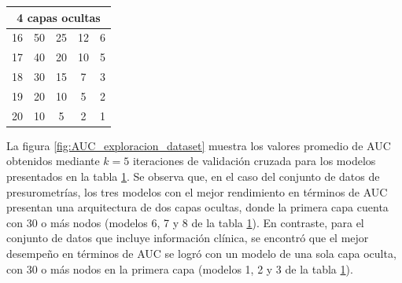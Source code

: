 \begin{table}[H]
\begin{tabular}{l c c c c}
    \hline
    \multicolumn{5}{c}{4 capas ocultas} \\
    \hline

    16               & 50             & 25			        & 12              & 6	\\
    17               & 40             & 20			        & 10              & 5	\\
    18               & 30             & 15			        & 7               & 3	\\
    19               & 20             & 10			        & 5               & 2	\\
    20               & 10             & 5			          & 2               & 1	\\

		\bottomrule
		\hline
	\end{tabular}
	\label{tab:tablamodelos}
\end{table}

La figura \ref{fig:AUC_exploracion_dataset} muestra los valores promedio de AUC obtenidos 
mediante $k=5$ iteraciones de validación cruzada para los modelos presentados en la tabla \ref{tab:tablamodelos}. 
Se observa que, en el caso del conjunto de datos de presurometrías, los tres modelos con el mejor rendimiento 
en términos de AUC presentan una arquitectura de dos capas ocultas, donde la primera capa cuenta con 30 o más 
nodos (modelos 6, 7 y 8 de la tabla \ref{tab:tablamodelos}). En contraste, para el conjunto de datos que incluye 
información clínica, se encontró que el mejor desempeño en términos de AUC se logró con un modelo de una sola 
capa oculta, con 30 o más nodos en la primera capa (modelos 1, 2 y 3 de la tabla \ref{tab:tablamodelos}).

